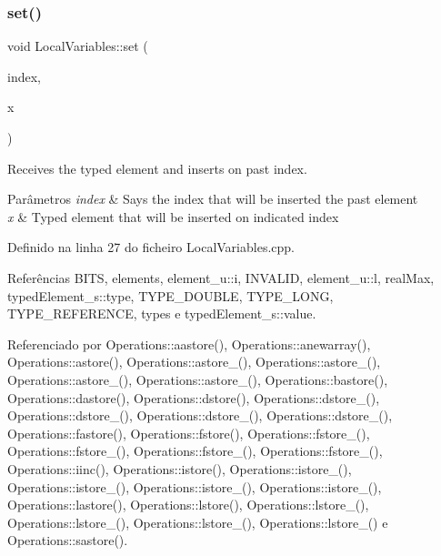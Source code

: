 \mbox{\label{classLocalVariables_a6d79e0c874931e97ed68a25cf60ab119}} 
\subsubsection{\texorpdfstring{set()}{set()}}
{\footnotesize\ttfamily void Local\+Variables\+::set (\begin{DoxyParamCaption}\item[{int}]{index,  }\item[{\hyperlink{BasicTypes_8h_a97b332303b1262282599e6ede0637b82}{Typed\+Element}}]{x }\end{DoxyParamCaption})}



Receives the typed element and inserts on past index. 


\begin{DoxyParams}{Parâmetros}
{\em index} & Says the index that will be inserted the past element \\
\hline
{\em x} & Typed element that will be inserted on indicated index \\
\hline
\end{DoxyParams}


Definido na linha 27 do ficheiro Local\+Variables.\+cpp.



Referências B\+I\+TS, elements, element\+\_\+u\+::i, I\+N\+V\+A\+L\+ID, element\+\_\+u\+::l, real\+Max, typed\+Element\+\_\+s\+::type, T\+Y\+P\+E\+\_\+\+D\+O\+U\+B\+LE, T\+Y\+P\+E\+\_\+\+L\+O\+NG, T\+Y\+P\+E\+\_\+\+R\+E\+F\+E\+R\+E\+N\+CE, types e typed\+Element\+\_\+s\+::value.



Referenciado por Operations\+::aastore(), Operations\+::anewarray(), Operations\+::astore(), Operations\+::astore\+\_(), Operations\+::astore\+\_(), Operations\+::astore\+\_(), Operations\+::astore\+\_(), Operations\+::bastore(), Operations\+::dastore(), Operations\+::dstore(), Operations\+::dstore\+\_(), Operations\+::dstore\+\_(), Operations\+::dstore\+\_(), Operations\+::dstore\+\_(), Operations\+::fastore(), Operations\+::fstore(), Operations\+::fstore\+\_(), Operations\+::fstore\+\_(), Operations\+::fstore\+\_(), Operations\+::fstore\+\_(), Operations\+::iinc(), Operations\+::istore(), Operations\+::istore\+\_(), Operations\+::istore\+\_(), Operations\+::istore\+\_(), Operations\+::istore\+\_(), Operations\+::lastore(), Operations\+::lstore(), Operations\+::lstore\+\_(), Operations\+::lstore\+\_(), Operations\+::lstore\+\_(), Operations\+::lstore\+\_() e Operations\+::sastore().



